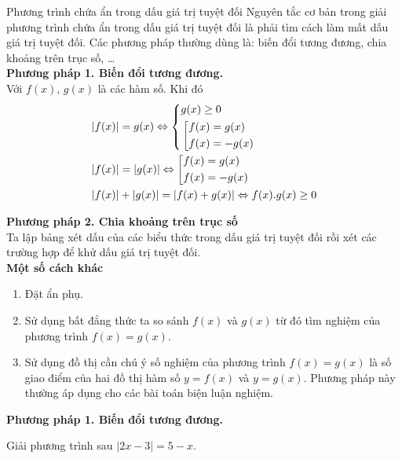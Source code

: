 \begin{dang}{Phương trình chứa ẩn trong dấu giá trị tuyệt đối}
	Nguyên tắc cơ bản trong giải phương trình chứa ẩn trong dấu giá trị tuyệt đối là phải tìm cách làm mất dấu giá trị tuyệt đối. Các phương pháp thường dùng là: biến đổi tương đương, chia khoảng trên trục số, \ldots\\
	
	\noindent\textbf{Phương pháp 1. Biến đổi tương đương.}\\ 
	Với $f(x)$, $g(x)$ là các hàm số. Khi đó
	\begin{align*}
	& |f(x)|=g(x)\Leftrightarrow\left\{\begin{aligned}& g(x)\geq 0\\&\left[\begin{aligned}& f(x)=g(x)\\& f(x)=-g(x)\end{aligned}\right.\end{aligned}\right.\\&
	|f(x)|=|g(x)|\Leftrightarrow\left[\begin{aligned}& f(x)=g(x)\\& f(x)=-g(x)\end{aligned}\right.\\&
	|f(x)|+|g(x)|=|f(x)+g(x)|\Leftrightarrow f(x).g(x)\geq 0
	\end{align*}  
	
	\noindent\textbf{Phương pháp 2. Chia khoảng trên trục số}\\
	Ta lập bảng xét dấu của các biểu thức trong dấu giá trị tuyệt đối rồi xét các trường hợp để khử dấu giá trị tuyệt đối.\\
	
	\noindent\textbf{Một số cách khác}
	\begin{enumerate}
		\item Đặt ẩn phụ.
		\item Sử dụng bất đẳng thức ta so sánh $f(x)$ và $g(x)$ từ đó tìm nghiệm của phương trình $f(x)=g(x)$.
		\item Sử dụng đồ thị cần chú ý số nghiệm của phương trình $f(x)=g(x)$ là số giao điểm của hai đồ thị hàm số $y=f(x)$ và $y=g(x)$. Phương pháp này thường áp dụng cho các bài toán biện luận nghiệm.
	\end{enumerate}
	
\end{dang}

\noindent\textbf{Phương pháp 1. Biến đổi tương đương.}

\begin{vd}%
	Giải phương trình sau $|2x-3|=5-x$.
\end{vd}

